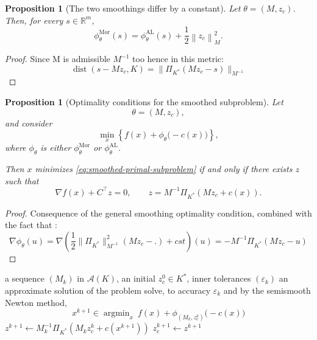 \documentclass[a4paper,11pt]{book}
\theoremstyle{plain}
\newtheorem{proposition}[theorem]{Proposition}
\theoremstyle{definition}
\theoremstyle{remark}
\numberwithin{equation}{chapter}
\numberwithin{algorithm}{chapter}
\newcommand{\R}{\mathbb{R}}
\newcommand{\proj}[2]{\Pi_{#2}\!\left(#1\right)}
\newcommand{\norm}[1]{\left\|#1\right\|}
\DeclareMathOperator{\dist}{dist}
\DeclareMathOperator*{\argmin}{argmin}
\begin{document}
	
	\begin{proposition}[The two smoothings differ by a constant]
		Let \(\theta=(M,z_c)\). Then, for every \(s\in\R^m\),
		\begin{equation}
			\phi^{\mathrm{Mor}}_\theta(s)
			=
			\phi^{\mathrm{AL}}_\theta(s)
			+
			\frac12\norm{z_c}_M^2.
		\end{equation}
	\end{proposition}
	
	\begin{proof}
		Since M is admissible $M^{-1}$ too hence in this metric: 
		$$ \dist(s-Mz_c,K) = \|\Pi_{K^*}(Mz_c-s)\|_{M^{-1}}$$
		
	\end{proof}
	
	\begin{proposition}[Optimality conditions for the smoothed subproblem]
		Let
		\[
		\theta=(M,z_c),
		\]
		and consider
		\begin{equation}
			\min_x
			\left\{
			f(x)+\phi_\theta\bigl(-c(x)\bigr)
			\right\},
			\label{eq:smoothed-primal-subproblem}
		\end{equation}
		where \(\phi_\theta\) is either
		\(\phi_\theta^{\mathrm{Mor}}\) or
		\(\phi_\theta^{\mathrm{AL}}\).
		
		Then \(x\) minimizes \eqref{eq:smoothed-primal-subproblem} if and only if
		there exists \(z\) such that
		\begin{equation}
			\nabla f(x)+C^\top z=0,
			\qquad
			z
			=
			M^{-1}
			\proj{Mz_c+c(x)}{K^*}.
		\end{equation}
	\end{proposition}
	
	\begin{proof}
		Consequence of the general smoothing optimality condition, combined with the fact that :
		$$ \nabla \phi_{\theta}(u) = \nabla (\frac{1}{2} \|\Pi_{K^*}\|^2_{M^{-1}}(Mz_c-.)+ cst)(u) = -M^{-1}\Pi_{K^*}(Mz_c-u)$$
	\end{proof}
	\begin{algorithm}[H]
		\caption{Augmented Lagrangian method}
		\begin{algorithmic}[1]
			\Require a sequence $(M_k)$ in $\mathcal{A}(K)$, an initial $z_c^0\in K^*$,
			inner tolerances $(\varepsilon_k)$
			\Ensure an approximate solution of the problem
			\State solve, to accuracy $\varepsilon_k$ and by the semismooth Newton method,
			\[
			x^{k+1}\in\argmin_x\ f(x)+\phi_{(M_k,z_c^k)}\bigl(-c(x)\bigr)
			\]
			\State $z^{k+1}\gets M_k^{-1}\proj{M_kz_c^k+c(x^{k+1})}{K^*}$
			\State $z_c^{k+1}\gets z^{k+1}$
			\EndFor
		\end{algorithmic}
	\end{algorithm}
	
\end{document}
